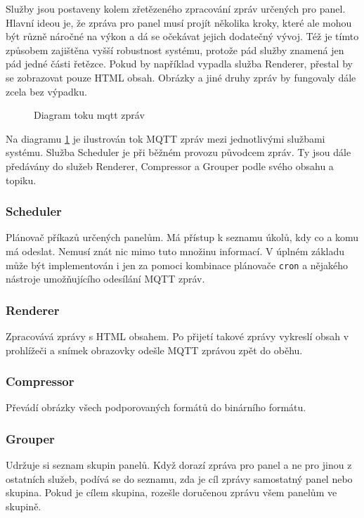 Služby jsou postaveny kolem zřetězeného zpracování zpráv určených pro panel. Hlavní ideou je, že zpráva pro panel musí projít několika kroky, které ale mohou být různě náročné na výkon a dá se očekávat jejich dodatečný vývoj. Též je tímto způsobem zajištěna vyšší robustnost systému, protože pád služby znamená jen pád jedné části řetězce. Pokud by například vypadla služba Renderer, přestal by se zobrazovat pouze HTML obsah. Obrázky a jiné druhy zpráv by fungovaly dále zcela bez výpadku. 

\begin{figure}[h]
    \centering
    
    \caption{Diagram toku mqtt zpráv}
    \label{fig:final-system-microservices}
\end{figure}

Na diagramu \ref{fig:final-system-microservices} je ilustrován tok MQTT zpráv mezi jednotlivými službami systému. Služba Scheduler je při běžném provozu původcem zpráv. Ty jsou dále předávány do služeb Renderer, Compressor a Grouper podle svého obsahu a topiku.

\subsubsection*{Scheduler}
Plánovač příkazů určených panelům. Má přístup k seznamu úkolů, kdy co a komu má odeslat. Nemusí znát nic mimo tuto množinu informací. V úplném základu může být implementován i jen za pomoci kombinace plánovače \lstinline|cron| a nějakého nástroje umožňujícího odesílání MQTT zpráv.

\subsubsection*{Renderer}
Zpracovává zprávy s HTML obsahem. Po přijetí takové zprávy vykreslí obsah v prohlížeči a snímek obrazovky odešle MQTT zprávou zpět do oběhu.

\subsubsection*{Compressor}
Převádí obrázky všech podporovaných formátů do binárního formátu.

\subsubsection*{Grouper}
Udržuje si seznam skupin panelů. Když dorazí zpráva pro panel a ne pro jinou z ostatních služeb, podívá se do seznamu, zda je cíl zprávy samostatný panel nebo skupina. Pokud je cílem skupina, rozešle doručenou zprávu všem panelům ve skupině.

